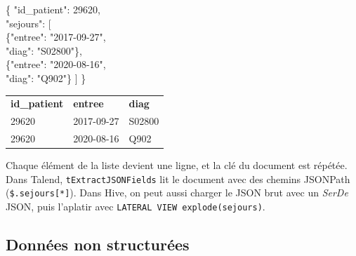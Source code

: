 \begin{center}
\begin{minipage}[t]{0.42\textwidth}
\begin{tcolorbox}[colback=gray!5,colframe=gray!60,title=\textbf{Document JSON},fonttitle=\small,boxsep=2pt]
\ttfamily\scriptsize
\{ "id\_patient": 29620,\\
\hspace*{1em}"sejours": [\\
\hspace*{2em}\{"entree": "2017-09-27",\\
\hspace*{2.6em}"diag": "S02800"\},\\
\hspace*{2em}\{"entree": "2020-08-16",\\
\hspace*{2.6em}"diag": "Q902"\} ] \}
\end{tcolorbox}
\end{minipage}\hspace{0.8cm}%
\begin{minipage}[t]{0.42\textwidth}
\begin{tcolorbox}[colback=title2!6,colframe=title1,title=\textbf{Après aplatissement},fonttitle=\small,boxsep=2pt]
\scriptsize
\begin{tabular}{@{}lll@{}}
\textbf{id\_patient} & \textbf{entree} & \textbf{diag} \\
29620 & 2017-09-27 & S02800 \\
29620 & 2020-08-16 & Q902 \\
\end{tabular}
\end{tcolorbox}
\end{minipage}
\end{center}

\noindent Chaque élément de la liste devient une ligne, et la clé du document est répétée. Dans Talend, \texttt{tExtractJSONFields} lit le document avec des chemins JSONPath (\texttt{\$.sejours[*]}). Dans Hive, on peut aussi charger le JSON brut avec un \textit{SerDe} JSON, puis l'aplatir avec \texttt{LATERAL VIEW explode(sejours)}.

\subsection{Données non structurées}

